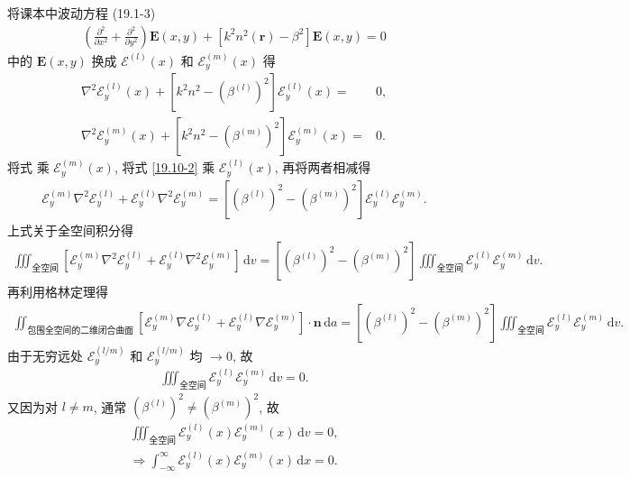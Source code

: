 \documentclass{note}
\begin{document}
\begin{pf}
    将课本中波动方程 (19.1-3)
    \begin{align}
        \left(\frac{\partial^2}{\partial x^2}+\frac{\partial^2}{\partial y^2}\right)\bm{E}(x,y)+[k^2n^2(\bm{r})-\beta^2]\bm{E}(x,y)=0
    \end{align}
    中的 $\bm{E}(x,y)$ 换成 $\mathcal{E}^{(l)}(x)$ 和 $\mathcal{E}_y^{(m)}(x)$ 得
    \begin{align}
        \label{19.10-1}
        \nabla^2\mathcal{E}_y^{(l)}(x)+[k^2n^2-(\beta^{(l)})^2]\mathcal{E}_y^{(l)}(x)=&0,\\
        \label{19.10-2}
        \nabla^2\mathcal{E}_y^{(m)}(x)+[k^2n^2-(\beta^{(m)})^2]\mathcal{E}_y^{(m)}(x)=&0.
    \end{align}
    将式 \label{19.10-1} 乘 $\mathcal{E}_y^{(m)}(x)$, 将式 \eqref{19.10-2} 乘 $\mathcal{E}_y^{(l)}(x)$, 再将两者相减得
    \begin{align}
        \mathcal{E}_y^{(m)}\nabla^2\mathcal{E}_y^{(l)}+\mathcal{E}_y^{(l)}\nabla^2\mathcal{E}_y^{(m)}=[(\beta^{(l)})^2-(\beta^{(m)})^2]\mathcal{E}_y^{(l)}\mathcal{E}_y^{(m)}.
    \end{align}
    上式关于全空间积分得
    \begin{align}
        \iiint_{\text{全空间}}[\mathcal{E}_y^{(m)}\nabla^2\mathcal{E}_y^{(l)}+\mathcal{E}_y^{(l)}\nabla^2\mathcal{E}_y^{(m)}]\,\mathrm{d}v=[(\beta^{(l)})^2-(\beta^{(m)})^2]\iiint_{\text{全空间}}\mathcal{E}_y^{(l)}\mathcal{E}_y^{(m)}\,\mathrm{d}v.
    \end{align}
    再利用格林定理得
    \begin{align}
        \iint_{\text{包围全空间的二维闭合曲面}}[\mathcal{E}_y^{(m)}\nabla\mathcal{E}_y^{(l)}+\mathcal{E}_y^{(l)}\nabla\mathcal{E}_y^{(m)}]\cdot\bm{n}\,\mathrm{d}a=[(\beta^{(l)})^2-(\beta^{(m)})^2]\iiint_{\text{全空间}}\mathcal{E}_y^{(l)}\mathcal{E}_y^{(m)}\,\mathrm{d}v.
    \end{align}
    由于无穷远处 $\mathcal{E}_y^{(l/m)}$ 和 $\mathcal{E}_y^{(l/m)}$ 均 $\rightarrow 0$, 故
    \begin{align}
        [(\beta^{(l)})^2-(\beta^{(m)})^2]\iiint_{\text{全空间}}\mathcal{E}_y^{(l)}\mathcal{E}_y^{(m)}\,\mathrm{d}v=0.
    \end{align}
    又因为对 $l\neq m$, 通常 $(\beta^{(l)})^2\neq(\beta^{(m)})^2$, 故
    \begin{gather}
        \iiint_{\text{全空间}}\mathcal{E}_y^{(l)}(x)\mathcal{E}_y^{(m)}(x)\,\mathrm{d}v=0,\\
        \Longrightarrow\int_{-\infty}^{\infty}\mathcal{E}_y^{(l)}(x)\mathcal{E}_y^{(m)}(x)\,\mathrm{d}x=0.
    \end{gather}
\end{pf}
\ifx\allfiles\undefined
\end{document}
